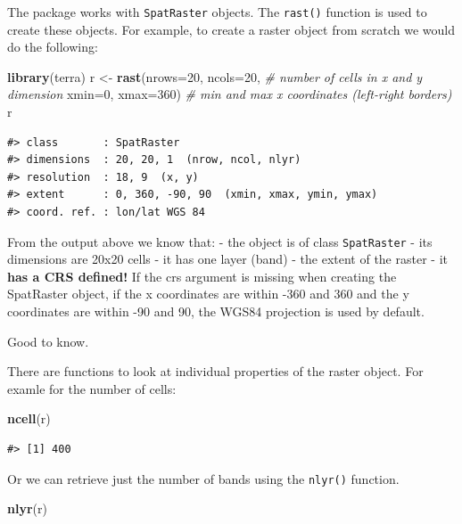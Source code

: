 \documentclass[
]{book}
\newenvironment{Shaded}{\begin{snugshade}}{\end{snugshade}}
\newcommand{\AttributeTok}[1]{\textcolor[rgb]{0.13,0.29,0.53}{#1}}
\newcommand{\CommentTok}[1]{\textcolor[rgb]{0.56,0.35,0.01}{\textit{#1}}}
\newcommand{\DecValTok}[1]{\textcolor[rgb]{0.00,0.00,0.81}{#1}}
\newcommand{\FunctionTok}[1]{\textcolor[rgb]{0.13,0.29,0.53}{\textbf{#1}}}
\newcommand{\NormalTok}[1]{#1}
\newcommand{\OtherTok}[1]{\textcolor[rgb]{0.56,0.35,0.01}{#1}}
\begin{document}
The package works with \texttt{SpatRaster} objects. The \texttt{rast()} function is used to create these objects. For example, to create a raster object from scratch we would do the following:

\begin{Shaded}
\begin{Highlighting}[]
\FunctionTok{library}\NormalTok{(terra)}
\NormalTok{r }\OtherTok{\textless{}{-}} \FunctionTok{rast}\NormalTok{(}\AttributeTok{nrows=}\DecValTok{20}\NormalTok{, }\AttributeTok{ncols=}\DecValTok{20}\NormalTok{, }\CommentTok{\# number of cells in x and y dimension}
          \AttributeTok{xmin=}\DecValTok{0}\NormalTok{, }\AttributeTok{xmax=}\DecValTok{360}\NormalTok{) }\CommentTok{\# min and max x coordinates (left{-}right borders)}
\NormalTok{r}
\end{Highlighting}
\end{Shaded}

\begin{verbatim}
#> class       : SpatRaster 
#> dimensions  : 20, 20, 1  (nrow, ncol, nlyr)
#> resolution  : 18, 9  (x, y)
#> extent      : 0, 360, -90, 90  (xmin, xmax, ymin, ymax)
#> coord. ref. : lon/lat WGS 84
\end{verbatim}

From the output above we know that:
- the object is of class \texttt{SpatRaster}
- its dimensions are 20x20 cells
- it has one layer (band)
- the extent of the raster
- it \textbf{has a CRS defined!} If the crs argument is missing when creating the SpatRaster object, if the x coordinates are within -360 and 360 and the y coordinates are within -90 and 90, the WGS84 projection is used by default.

Good to know.

There are functions to look at individual properties of the raster object. For examle for the number of cells:

\begin{Shaded}
\begin{Highlighting}[]
\FunctionTok{ncell}\NormalTok{(r)}
\end{Highlighting}
\end{Shaded}

\begin{verbatim}
#> [1] 400
\end{verbatim}

Or we can retrieve just the number of bands using the \texttt{nlyr()} function.

\begin{Shaded}
\begin{Highlighting}[]
\FunctionTok{nlyr}\NormalTok{(r)}
\end{Highlighting}
\end{Shaded}
\end{document}
